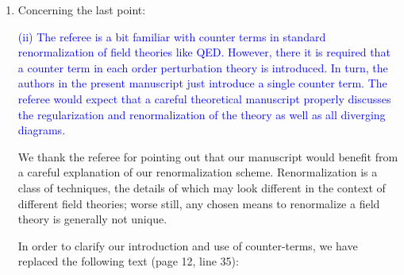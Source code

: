 \documentclass[preprint]{revtex4-1}
\newcommand{\1}{\mathds{1}}
\newcommand{\blue}[1]{\textcolor{blue}{#1}}
\begin{document}
\begin{enumerate}
\item Concerning the last point:

  \blue{(ii) The referee is a bit familiar with counter terms in
    standard renormalization of field theories like QED. However,
    there it is required that a counter term in each order
    perturbation theory is introduced. In turn, the authors in the
    present manuscript just introduce a single counter term. The
    referee would expect that a careful theoretical manuscript
    properly discusses the regularization and renormalization of the
    theory as well as all diverging diagrams.}

  \label{pt:renormalization}

  We thank the referee for pointing out that our manuscript would
  benefit from a careful explanation of our renormalization scheme.
  Renormalization is a class of techniques, the details of which may
  look different in the context of different field theories; worse
  still, any chosen means to renormalize a field theory is generally
  not unique.

  In order to clarify our introduction and use of counter-terms, we
  have replaced the following text (page 12, line 35):


\end{enumerate}
\end{document}
